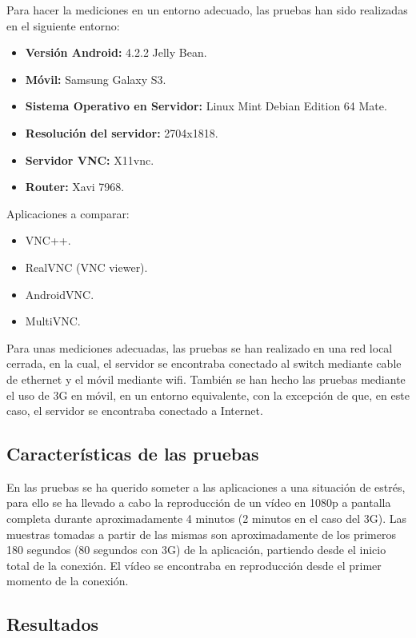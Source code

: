 Para hacer la mediciones en un entorno adecuado, las pruebas han sido realizadas en el siguiente entorno:
\begin{itemize}
\item \textbf{Versión Android:} 4.2.2 Jelly Bean.
\item \textbf{Móvil:} Samsung Galaxy S3.
\item \textbf{Sistema Operativo en Servidor:} Linux Mint Debian Edition 64 Mate.
\item \textbf{Resolución del servidor:} 2704x1818.
\item \textbf{Servidor VNC:} X11vnc.
\item \textbf{Router:} Xavi 7968.
\end{itemize}

Aplicaciones a comparar:
\begin{itemize}
\item VNC++.
\item RealVNC (VNC viewer).
\item AndroidVNC.
\item MultiVNC.
\end{itemize}

Para unas mediciones adecuadas, las pruebas se han realizado en una red local cerrada, en la cual, el servidor se encontraba conectado al switch mediante cable de ethernet y el móvil mediante wifi. También se han hecho las pruebas mediante el uso de 3G en móvil, en un entorno equivalente, con la excepción de que, en este caso, el servidor se encontraba conectado a Internet.

\subsection{Características de las pruebas}

En las pruebas se ha querido someter a las aplicaciones a una situación de estrés, para ello se ha llevado a cabo la reproducción de un vídeo en 1080p a pantalla completa durante aproximadamente 4 minutos (2 minutos en el caso del 3G). Las muestras tomadas a partir de las mismas son aproximadamente de los primeros 180 segundos (80 segundos con 3G) de la aplicación, partiendo desde el inicio total de la conexión. El vídeo se encontraba en reproducción desde el primer momento de la conexión.

\subsection{Resultados}

